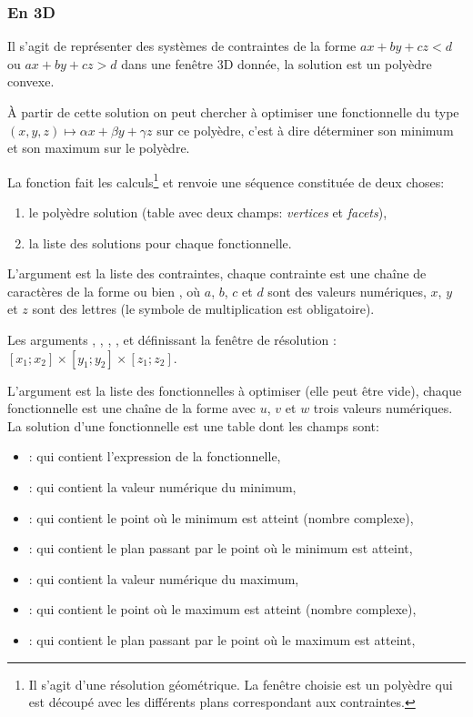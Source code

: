 \subsubsection{En 3D}

Il s'agit de représenter des systèmes de contraintes de la forme $ax+by+cz<d$ ou $ax+by+cz>d$ dans une fenêtre 3D donnée, la solution est un polyèdre convexe.

À partir de cette solution on peut chercher à optimiser une fonctionnelle du type $(x,y,z)\mapsto \alpha x+\beta y+\gamma z$ sur ce polyèdre, c'est à dire déterminer son minimum et son maximum sur le polyèdre.

La fonction  fait les calculs\footnote{Il s'agit d'une résolution géométrique. La fenêtre choisie est un polyèdre qui est découpé avec les différents plans correspondant aux contraintes.} et renvoie une séquence constituée de deux choses: 
    \begin{enumerate}
        \item le polyèdre solution (table avec deux champs: \emph{vertices} et \emph{facets}),
        \item la liste des solutions pour chaque fonctionnelle.
    \end{enumerate}
    
L'argument  est la liste des contraintes, chaque contrainte est une chaîne de caractères de la forme  ou bien , où $a$, $b$, $c$ et $d$ sont des valeurs numériques, $x$, $y$ et $z$ sont des lettres (le symbole de multiplication est obligatoire).

Les arguments , , , ,  et   définissant la fenêtre de résolution : $[x_1;x_2]\times [y_1;y_2]\times [z_1;z_2]$.

L'argument  est la liste des fonctionnelles à optimiser (elle peut être vide), chaque fonctionnelle est une chaîne de la forme  avec $u$, $v$ et $w$ trois valeurs numériques. La solution d'une fonctionnelle est une table dont les champs sont:
    \begin{itemize}
        \item {} : qui contient l'expression de la fonctionnelle,
        \item {} : qui contient la valeur numérique du minimum,
        \item {} : qui contient le point où le minimum est atteint (nombre complexe),
        \item {} : qui contient le plan passant par le point où le minimum est atteint,
        \item {} : qui contient la valeur numérique du maximum,
        \item {} : qui contient le point où le maximum est atteint (nombre complexe),
        \item {} : qui contient le plan passant par le point où le maximum est atteint,
    \end{itemize}

